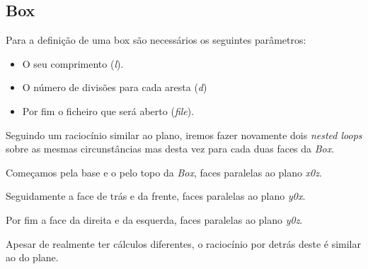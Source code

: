 \documentclass[14pt, a4 paper]{article}
\begin{document}
\begin{lstlisting}[language=c++]

\end{lstlisting}

\subsection{Box}
Para a definição de uma box são necessários os seguintes parâmetros:

\begin{itemize}
    \item O seu comprimento (\textit{l}).
    \item O número de divisões para cada aresta (\textit{d})
    \item Por fim o ficheiro que será aberto (\textit{file}).

\end{itemize}

Seguindo um raciocínio similar ao plano, iremos fazer novamente dois \textit{nested loops} sobre as mesmas circunstâncias mas desta vez para cada duas faces da \textit{Box}.

Começamos pela base e o pelo topo da \textit{Box}, faces paralelas ao plano \textit{x0z}.

Seguidamente a face de trás e da frente, faces paralelas ao plano \textit{y0x}.

Por fim a face da direita e da esquerda, faces paralelas ao plano \textit{y0z}.

Apesar de realmente ter cálculos diferentes, o raciocínio por detrás deste é similar ao do plane.
\end{document}
